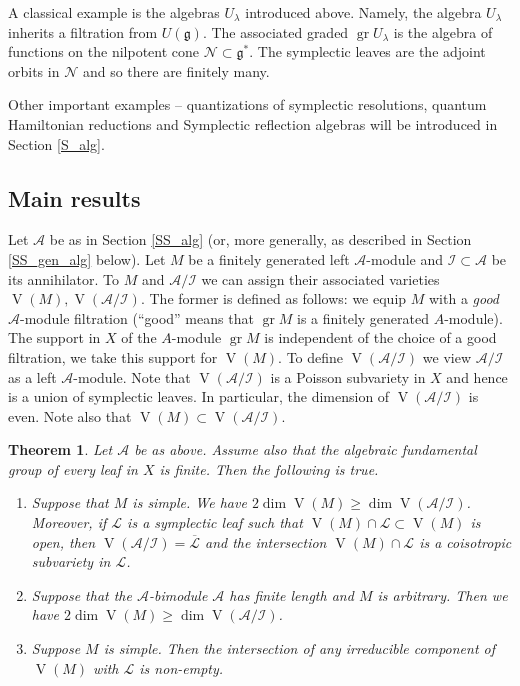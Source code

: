 \documentclass[12pt]{amsart}
\newcommand{\A}{\mathcal{A}}
\newcommand{\I}{\mathcal{I}}
\newcommand{\VA}{\operatorname{V}}
\newcommand{\gr}{\operatorname{gr}}
\newcommand{\g}{\mathfrak{g}}
\newtheorem{Thm}{Theorem}[section]
\theoremstyle{definition}
\begin{document}
A classical example is the algebras $U_\lambda$ introduced above. Namely, the algebra $U_\lambda$
inherits a filtration from $U(\g)$. The associated graded $\gr U_\lambda$ is the algebra of functions
on the nilpotent cone $\mathcal{N}\subset \g^*$. The symplectic leaves are the adjoint orbits in $\mathcal{N}$
and so there are finitely many.

Other important examples -- quantizations of symplectic resolutions, quantum Hamiltonian reductions
and Symplectic reflection algebras will be introduced in Section \ref{S_alg}.

\subsection{Main results}
Let $\A$ be as in Section \ref{SS_alg} (or, more generally, as described in Section \ref{SS_gen_alg} below).
Let $M$ be a finitely generated left $\A$-module and $\I\subset\A$ be its annihilator. To $M$ and $\A/\I$
we can assign their associated varieties $\VA(M), \VA(\A/\I)$. The former is defined as follows:
we equip $M$ with a {\it good} $\A$-module filtration (``good'' means that $\gr M$ is a finitely generated
$A$-module). The support in $X$ of the $A$-module $\gr M$ is independent of the choice of a good filtration,
we take this support for $\VA(M)$. To define $\VA(\A/\I)$ we view $\A/\I$ as a left $\A$-module. Note that
$\VA(\A/\I)$ is a Poisson subvariety in $X$ and hence is a union of symplectic leaves. In particular, the dimension
of $\VA(\A/\I)$ is even. Note also that $\VA(M)\subset \VA(\A/\I)$.

\begin{Thm}\label{Thm:main_ineq}
Let $\A$ be as above. Assume also that the algebraic fundamental group of every leaf in $X$
is finite. Then the following is true.
\begin{enumerate}
\item Suppose that $M$ is simple.  We have $2\dim \VA(M)\geqslant \dim \VA(\A/\I)$. Moreover, if $\mathcal{L}$
is a symplectic leaf such that $\VA(M)\cap \mathcal{L}\subset \VA(M)$ is open, then $\VA(\A/\I)=\overline{\mathcal{L}}$
and the intersection $\VA(M)\cap \mathcal{L}$ is a coisotropic subvariety in $\mathcal{L}$.
\item Suppose that the $\A$-bimodule $\A$ has finite length and $M$ is arbitrary. Then we have $2\dim \VA(M)
\geqslant \dim \VA(\A/\I)$.
\item Suppose $M$ is simple. Then the intersection of any irreducible component of $\VA(M)$ with $\mathcal{L}$ is non-empty.
\end{enumerate}
\end{Thm}
\end{document}
